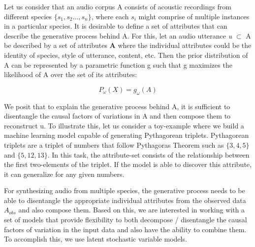 Let us consider that an audio corpus A consists of acoustic recordings from different species $\{ s_1, s_2...,s_n \}$, where each $s_i$ might comprise of multiple instances in a particular species. It is desirable to define a set of attributes that can describe the generative process behind A. For this, let an audio utterance \textit{u} $\subset$ A be described by a set of attributes \textbf{A} where the individual attributes could be the identity of species, style of utterance, content, etc. Then the prior distribution of A can be represented by a parametric function g such that g maximizes the likelihood of A over the set of its attributes:

\begin{equation}
P_{\omega}(X) = g_{\omega}(A)
\end{equation}

We posit that to explain the generative process behind A, it is sufficient to disentangle the causal factors of variations in A and then compose them to reconstruct u. To illustrate this, let us consider a toy-example where we build a machine learning model capable of generating Pythagorean triplets. Pythagorean triplets are a triplet of numbers that follow Pythagoras Theorem such as $\{3,4,5\}$ and $\{5,12,13 \}$. In this task, the attribute-set consists of the relationship between the first two-elements of the triplet. If the model is able to discover this attribute, it can generalize for any given numbers.


For synthesizing audio from multiple species, the generative process needs to be able to disentangle the appropriate individual attributes from the observed data $A_{obs}$ and also compose them. Based on this, we are interested in working with a set of models that provide flexibility to both decompose / disentangle the causal factors of variation in the input data and also have the ability to combine them. To accomplish this, we use  latent stochastic variable models. 

